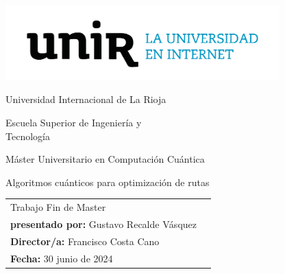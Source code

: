 \begin{center}
	\includegraphics[width=10.6cm,height=2.88cm]{logo}

	\Huge Universidad Internacional de La Rioja

	\huge Escuela Superior de Ingeniería y \\ Tecnología

	\vspace{100pt}

	\LARGE Máster Universitario en Computación Cuántica

	\Huge \textcolor{unir-azul-fuerte}{Algoritmos cuánticos para optimización de rutas}
	\normalsize

	\vspace{100pt}

\end{center}
\begin{tabular}{ll}
	Trabajo Fin de Master & \\
	\textbf{presentado por:} Gustavo Recalde Vásquez & \\
	\textbf{Director/a:} Francisco Costa Cano & \\
	\textbf{Fecha:} 30 junio de 2024 & \\
\end{tabular}